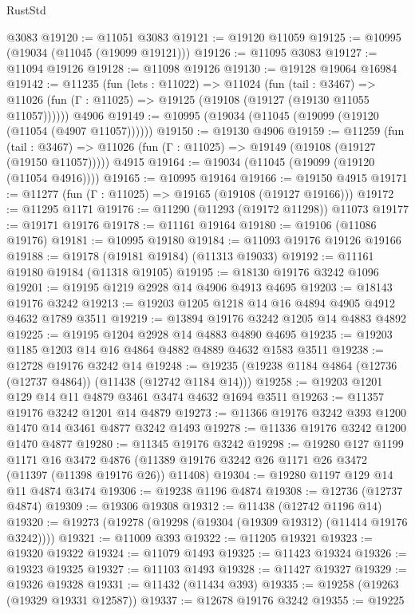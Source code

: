 \begin{lexlean}{RustStd}
\begin{coremodule}
    @3083
@19120 := @11051 @3083
@19121 := @19120 @11059
@19125 := @10995 (@19034 (@11045 (@19099 @19121)))
@19126 := @11095 @3083
@19127 := @11094 @19126
@19128 := @11098 @19126
@19130 := @19128 @19064 @16984
@19142 := @11235
    (fun (lets : @11022) =>
    @11024
      (fun (tail : @3467) =>
      @11026 (fun (Γ : @11025) => @19125 (@19108 (@19127 (@19130 @11055 @11057))))))
    @4906
@19149 := @10995 (@19034 (@11045 (@19099 (@19120 (@11054 (@4907 @11057))))))
@19150 := @19130 @4906
@19159 := @11259
    (fun (tail : @3467) => @11026 (fun (Γ : @11025) => @19149 (@19108 (@19127 (@19150 @11057)))))
    @4915
@19164 := @19034 (@11045 (@19099 (@19120 (@11054 @4916))))
@19165 := @10995 @19164
@19166 := @19150 @4915
@19171 := @11277 (fun (Γ : @11025) => @19165 (@19108 (@19127 @19166)))
@19172 := @11295 @1171
@19176 := @11290 (@11293 (@19172 @11298)) @11073
@19177 := @19171 @19176
@19178 := @11161 @19164
@19180 := @19106 (@11086 @19176)
@19181 := @10995 @19180
@19184 := @11093 @19176 @19126 @19166
@19188 := @19178 (@19181 @19184) (@11313 @19033)
@19192 := @11161 @19180 @19184 (@11318 @19105)
@19195 := @18130 @19176 @3242 @1096
@19201 := @19195 @1219 @2928 @14 @4906 @4913 @4695
@19203 := @18143 @19176 @3242
@19213 := @19203 @1205 @1218 @14 @16 @4894 @4905 @4912 @4632 @1789 @3511
@19219 := @13894 @19176 @3242 @1205 @14 @4883 @4892
@19225 := @19195 @1204 @2928 @14 @4883 @4890 @4695
@19235 := @19203 @1185 @1203 @14 @16 @4864 @4882 @4889 @4632 @1583 @3511
@19238 := @12728 @19176 @3242 @14
@19248 := @19235 (@19238 @1184 @4864 (@12736 (@12737 @4864)) (@11438 (@12742 @1184 @14)))
@19258 := @19203 @1201 @129 @14 @11 @4879 @3461 @3474 @4632 @1694 @3511
@19263 := @11357 @19176 @3242 @1201 @14 @4879
@19273 := @11366 @19176 @3242 @393 @1200 @1470 @14 @3461 @4877 @3242 @1493
@19278 := @11336 @19176 @3242 @1200 @1470 @4877
@19280 := @11345 @19176 @3242
@19298 := @19280
    @127
    @1199
    @1171
    @16
    @3472
    @4876
    (@11389 @19176 @3242 @26 @1171 @26 @3472 (@11397 (@11398 @19176 @26)) @11408)
@19304 := @19280 @1197 @129 @14 @11 @4874 @3474
@19306 := @19238 @1196 @4874
@19308 := @12736 (@12737 @4874)
@19309 := @19306 @19308
@19312 := @11438 (@12742 @1196 @14)
@19320 := @19273 (@19278 (@19298 (@19304 (@19309 @19312) (@11414 @19176 @3242))))
@19321 := @11009 @393
@19322 := @11205 @19321
@19323 := @19320 @19322
@19324 := @11079 @1493
@19325 := @11423 @19324
@19326 := @19323 @19325
@19327 := @11103 @1493
@19328 := @11427 @19327
@19329 := @19326 @19328
@19331 := @11432 (@11434 @393)
@19335 := @19258 (@19263 (@19329 @19331 @12587))
@19337 := @12678 @19176 @3242
@19355 := @19225

\end{coremodule}
\end{lexlean}
